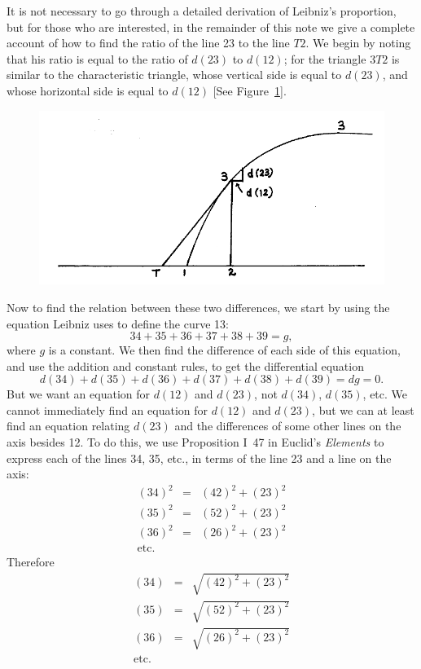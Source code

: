 \documentclass[polutonikogreek,english,twoside,openright]{article}
\newlength{\oldjot}
\begin{document}
It is not necessary to go through a detailed derivation of Leibniz's
proportion, but for those who are interested, in the remainder of this
note we give a complete account of how to find the ratio of the line
23 to the line $T2$. We begin by noting that his ratio is equal to the
ratio of $d(23)$ to $d(12)$; for the triangle $3T2$ is similar to the
characteristic triangle, whose vertical side is equal to $d(23)$, and
whose horizontal side is equal to $d(12)$ [See Figure~\ref{locus2A}].
\begin{figure}[htp]
\begin{center}
\includegraphics[width=\textwidth]{fig/Figure25}
\caption{}
\label{locus2A}
\vspace{-10pt}
\end{center}
\end{figure} Now to find the relation between these two differences,
we start by using the equation Leibniz uses to define the curve 13:
$$34 + 35 + 36 + 37 + 38 + 39 = g,$$
where $g$ is a constant.  We then find the difference of each side of
this equation, and use the addition and constant rules, to get the
differential equation
$$d(34) + d(35) + d(36) + d(37) + d(38) + d(39) = dg = 0.$$
But we want an equation for $d(12)$ and $d(23)$, not $d(34)$, $d(35)$,
etc.  We cannot immediately find an equation for $d(12)$ and $d(23)$,
but we can at least find an equation relating $d(23)$ and the
differences of some other lines on the axis besides 12.  To do this,
we use Proposition I~47 in Euclid's {\em Elements} to express each of
the lines 34, 35, etc., in terms of the line 23 and a line on the
axis: \setlength{\jot}{1ex}
\begin{eqnarray*}
(34)^2 & = & (42)^2 + (23)^2\\
(35)^2 & = & (52)^2 + (23)^2\\
(36)^2 & = & (26)^2 + (23)^2\\
\mbox{etc.} & & 
\end{eqnarray*}
\setlength{\jot}{\oldjot}
Therefore
\setlength{\jot}{1.5ex}
\begin{eqnarray*}
(34) & = & \sqrt{(42)^2 + (23)^2}\\
(35) & = & \sqrt{(52)^2 + (23)^2}\\
(36) & = & \sqrt{(26)^2 + (23)^2}\\
\mbox{etc.} & & 
\end{eqnarray*}
\setlength{\jot}{\oldjot}
\end{document}
